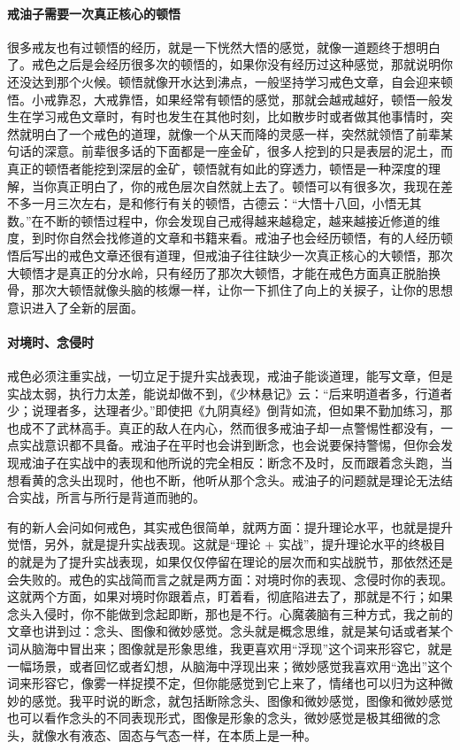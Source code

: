 \paragraph{戒油子需要一次真正核心的顿悟}

很多戒友也有过顿悟的经历，就是一下恍然大悟的感觉，就像一道题终于想明白了。戒色之后是会经历很多次的顿悟的，如果你没有经历过这种感觉，那就说明你还没达到那个火候。顿悟就像开水达到沸点，一般坚持学习戒色文章，自会迎来顿悟。小戒靠忍，大戒靠悟，如果经常有顿悟的感觉，那就会越戒越好，顿悟一般发生在学习戒色文章时，有时也发生在其他时刻，比如散步时或者做其他事情时，突然就明白了一个戒色的道理，就像一个从天而降的灵感一样，突然就领悟了前辈某句话的深意。前辈很多话的下面都是一座金矿，很多人挖到的只是表层的泥土，而真正的顿悟者能挖到深层的金矿，顿悟就有如此的穿透力，顿悟是一种深度的理解，当你真正明白了，你的戒色层次自然就上去了。顿悟可以有很多次，我现在差不多一月三次左右，是和修行有关的顿悟，古德云：“大悟十八回，小悟无其数。”在不断的顿悟过程中，你会发现自己戒得越来越稳定，越来越接近修道的维度，到时你自然会找修道的文章和书籍来看。戒油子也会经历顿悟，有的人经历顿悟后写出的戒色文章还很有道理，但戒油子往往缺少一次真正核心的大顿悟，那次大顿悟才是真正的分水岭，只有经历了那次大顿悟，才能在戒色方面真正脱胎换骨，那次大顿悟就像头脑的核爆一样，让你一下抓住了向上的关捩子，让你的思想意识进入了全新的层面。

\paragraph{对境时、念侵时}

戒色必须注重实战，一切立足于提升实战表现，戒油子能谈道理，能写文章，但是实战太弱，执行力太差，能说却做不到，《少林悬记》云：“后来明道者多，行道者少；说理者多，达理者少。”即使把《九阴真经》倒背如流，但如果不勤加练习，那也成不了武林高手。真正的敌人在内心，然而很多戒油子却一点警惕性都没有，一点实战意识都不具备。戒油子在平时也会讲到断念，也会说要保持警惕，但你会发现戒油子在实战中的表现和他所说的完全相反：断念不及时，反而跟着念头跑，当想看黄的念头出现时，他也不断，他听从那个念头。戒油子的问题就是理论无法结合实战，所言与所行是背道而驰的。

有的新人会问如何戒色，其实戒色很简单，就两方面：提升理论水平，也就是提升觉悟，另外，就是提升实战表现。这就是“理论 + 实战”，提升理论水平的终极目的就是为了提升实战表现，如果仅仅停留在理论的层次而和实战脱节，那依然还是会失败的。戒色的实战简而言之就是两方面：对境时你的表现、念侵时你的表现。这就两个方面，如果对境时你跟着点，盯着看，彻底陷进去了，那就是不行；如果念头入侵时，你不能做到念起即断，那也是不行。心魔袭脑有三种方式，我之前的文章也讲到过：念头、图像和微妙感觉。念头就是概念思维，就是某句话或者某个词从脑海中冒出来；图像就是形象思维，我更喜欢用“浮现”这个词来形容它，就是一幅场景，或者回忆或者幻想，从脑海中浮现出来；微妙感觉我喜欢用“逸出”这个词来形容它，像雾一样捉摸不定，但你能感觉到它上来了，情绪也可以归为这种微妙的感觉。我平时说的断念，就包括断除念头、图像和微妙感觉，图像和微妙感觉也可以看作念头的不同表现形式，图像是形象的念头，微妙感觉是极其细微的念头，就像水有液态、固态与气态一样，在本质上是一种。

